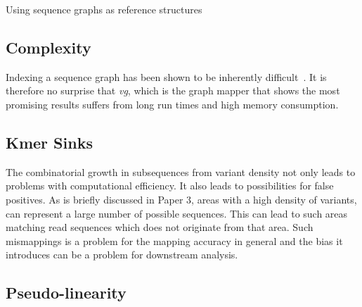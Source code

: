 Using sequence graphs as reference structures
\subsection{Complexity}
Indexing a sequence graph has been shown to be inherently difficult~\cite{indexgraphs}. It is therefore no surprise that \emph{vg}, which is the graph mapper that shows the most promising results suffers from long run times and high memory consumption. 

\subsection{Kmer Sinks}
The combinatorial growth in subsequences from variant density not only leads to problems with computational efficiency. It also leads to possibilities for false positives.
As is briefly discussed in Paper 3, areas with a high density of variants, can represent a large number of possible sequences.
This can lead to such areas matching read sequences which does not originate from that area. 
Such mismappings is a problem for the mapping accuracy in general and the bias it introduces can be a problem for downstream analysis. 

\subsection{Pseudo-linearity}



